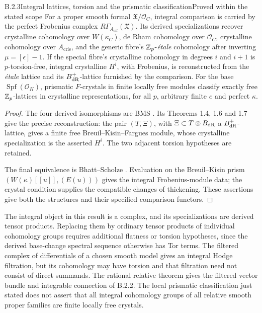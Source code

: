 \begin{result}{B.2.3}{Integral lattices, torsion and the prismatic classification}{Proved within the stated scope}
For a proper smooth formal $\mathfrak X/\mathcal O_C$, integral
comparison is carried by the perfect Frobenius complex
$R\Gamma_{A_{\inf}}(\mathfrak X)$. Its derived specializations
recover crystalline cohomology over $W(\kappa_C)$, de Rham
cohomology over $\mathcal O_C$, crystalline cohomology over
$A_{\mathrm{cris}}$, and the generic fibre's $\mathbb Z_p$-\emph{\'etale}
cohomology after inverting $\mu=[\epsilon]-1$.
If the special fibre's crystalline cohomology in degrees $i$
and $i+1$ is $p$-torsion-free, integral crystalline $H^i$, with
Frobenius, is reconstructed from the \emph{\'etale} lattice
and its $B_{\mathrm{dR}}^+$-lattice furnished by the comparison.
For the base $\operatorname{Spf}(\mathcal O_K)$, prismatic
$F$-crystals in finite locally free modules classify exactly
free $\mathbb Z_p$-lattices in crystalline representations, for all
$p$, arbitrary finite $e$ and perfect $\kappa$.
\end{result}
\begin{proof}
The four derived isomorphisms are BMS
\cite[Theorem 1.8]{BMS2018}. Its Theorems 1.4, 1.6 and 1.7
give the precise reconstruction: the pair $(T,\Xi)$, with
$\Xi\subset T\otimes B_{\mathrm{dR}}$ a $B_{\mathrm{dR}}^+$-lattice, gives
a finite free Breuil--Kisin--Fargues module, whose crystalline
specialization is the asserted $H^i$. The two adjacent
torsion hypotheses are retained.

The final equivalence is Bhatt--Scholze
\cite[Theorem 1.2, equivalently Theorem 5.6]{BhattScholzePrismaticCrystals}.
Evaluation on the Breuil--Kisin prism
$(W(\kappa)[[u]],(E(u)))$ gives the integral Frobenius-module
data; the crystal condition supplies the compatible changes of
thickening. These assertions give both the structures and their
specified comparison functors.
\end{proof}

The integral object in this result is a complex, and its
specializations are derived tensor products. Replacing them by
ordinary tensor products of individual cohomology groups
requires additional flatness or torsion hypotheses, since the
derived base-change spectral sequence otherwise has Tor terms.
The filtered complex of differentials of a chosen smooth model
gives an integral Hodge filtration, but its cohomology may have
torsion and that filtration need not consist of direct summands.
The rational relative theorem gives the filtered vector bundle
and integrable connection of B.2.2. The local prismatic
classification just stated does not assert that all integral
cohomology groups of all relative smooth proper families are
finite locally free crystals.

